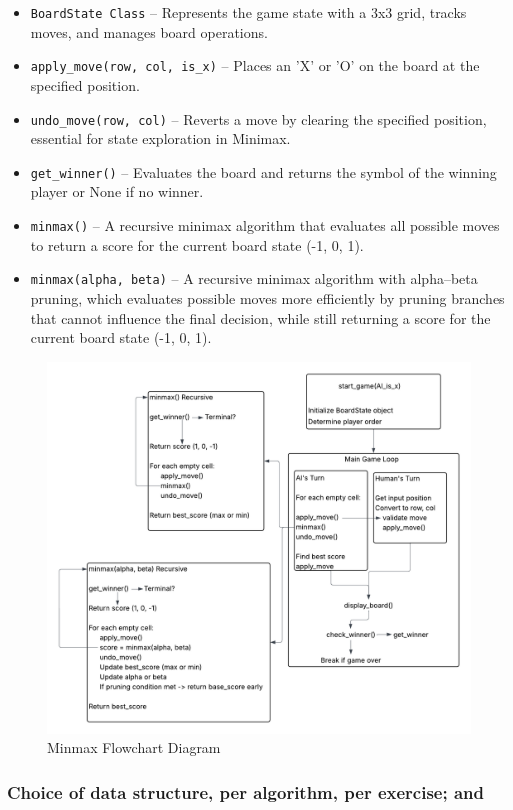 \documentclass[journal]{./IEEE/IEEEtran}
\begin{document}
\begin{itemize}
  \item \texttt{BoardState Class} – Represents the game state with a 3x3 grid, tracks moves, and manages board operations.

  \item \texttt{apply\_move(row, col, is\_x)} – Places an 'X' or 'O' on the board at the specified position.

  \item \texttt{undo\_move(row, col)} – Reverts a move by clearing the specified position, essential for state exploration in Minimax.

  \item \texttt{get\_winner()} – Evaluates the board and returns the symbol of the winning player or None if no winner.

  \item \texttt{minmax()} – A recursive minimax algorithm that evaluates all possible moves to return a score for the current board state (-1, 0, 1).

  \item \texttt{minmax(alpha, beta)} – A recursive minimax algorithm with alpha–beta pruning, which evaluates possible moves more efficiently by pruning branches that cannot influence the final decision, while still returning a score for the current board state (-1, 0, 1).
\end{itemize}

\begin{figure}[H]
    \centering
    \includegraphics[width=0.6\linewidth]{pictures-Clarence/minmax flowchart.png}
    \caption{Minmax Flowchart Diagram}
    \label{fig:placeholder}
\end{figure}

\subsubsection{Choice of data structure, per algorithm, per exercise; and}
\end{document}
